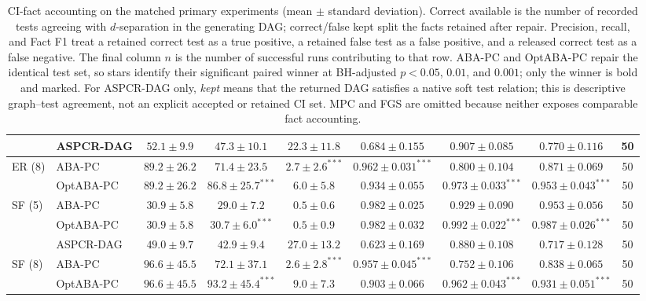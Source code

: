 \begin{table}[t]
\begin{tabular}{llccccccc}
 & ASPCR-DAG & $52.1\pm9.9$ & $47.3\pm10.1$ & $22.3\pm11.8$ & $0.684\pm0.155$ & $0.907\pm0.085$ & $0.770\pm0.116$ & 50\\
\midrule
ER (8) & ABA-PC & $89.2\pm26.2$ & $71.4\pm23.5$ & $\mathbf{2.7\pm2.6}^{***}$ & $\mathbf{0.962\pm0.031}^{***}$ & $0.800\pm0.104$ & $0.871\pm0.069$ & 50\\
 & OptABA-PC & $89.2\pm26.2$ & $\mathbf{86.8\pm25.7}^{***}$ & $6.0\pm5.8$ & $0.934\pm0.055$ & $\mathbf{0.973\pm0.033}^{***}$ & $\mathbf{0.953\pm0.043}^{***}$ & 50\\
\midrule
SF (5) & ABA-PC & $30.9\pm5.8$ & $29.0\pm7.2$ & $0.5\pm0.6$ & $0.982\pm0.025$ & $0.929\pm0.090$ & $0.953\pm0.056$ & 50\\
 & OptABA-PC & $30.9\pm5.8$ & $\mathbf{30.7\pm6.0}^{***}$ & $0.5\pm0.9$ & $0.982\pm0.032$ & $\mathbf{0.992\pm0.022}^{***}$ & $\mathbf{0.987\pm0.026}^{***}$ & 50\\
 & ASPCR-DAG & $49.0\pm9.7$ & $42.9\pm9.4$ & $27.0\pm13.2$ & $0.623\pm0.169$ & $0.880\pm0.108$ & $0.717\pm0.128$ & 50\\
\midrule
SF (8) & ABA-PC & $96.6\pm45.5$ & $72.1\pm37.1$ & $\mathbf{2.6\pm2.8}^{***}$ & $\mathbf{0.957\pm0.045}^{***}$ & $0.752\pm0.106$ & $0.838\pm0.065$ & 50\\
 & OptABA-PC & $96.6\pm45.5$ & $\mathbf{93.2\pm45.4}^{***}$ & $9.0\pm7.3$ & $0.903\pm0.066$ & $\mathbf{0.962\pm0.043}^{***}$ & $\mathbf{0.931\pm0.051}^{***}$ & 50\\
\bottomrule
\end{tabular}
\caption{CI-fact accounting on the matched primary experiments (mean $\pm$ standard deviation). Correct available is the number of recorded tests agreeing with $d$-separation in the generating DAG; correct/false kept split the facts retained after repair. Precision, recall, and Fact F1 treat a retained correct test as a true positive, a retained false test as a false positive, and a released correct test as a false negative. The final column $n$ is the number of successful runs contributing to that row. ABA-PC and OptABA-PC repair the identical test set, so stars identify their significant paired winner at BH-adjusted $p<0.05$, $0.01$, and $0.001$; only the winner is bold and marked. For ASPCR-DAG only, \emph{kept} means that the returned DAG satisfies a native soft test relation; this is descriptive graph--test agreement, not an explicit accepted or retained CI set. MPC and FGS are omitted because neither exposes comparable fact accounting.}
\label{tab:final-fact-metrics}
\end{table}
